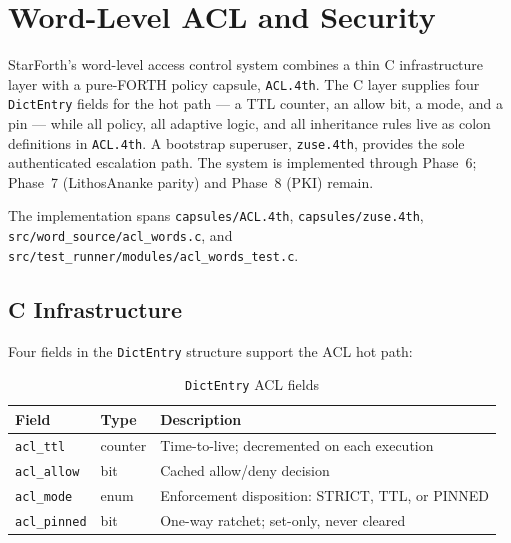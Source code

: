 
\chapter{Word-Level ACL and Security}
\label{vol2:chap:acl}

StarForth's word-level access control system combines a thin C infrastructure
layer with a pure-FORTH policy capsule, \texttt{ACL.4th}. The C layer supplies
four \texttt{DictEntry} fields for the hot path --- a TTL counter, an allow
bit, a mode, and a pin --- while all policy, all adaptive logic, and all
inheritance rules live as colon definitions in \texttt{ACL.4th}. A bootstrap
superuser, \texttt{zuse.4th}, provides the sole authenticated escalation path.
The system is implemented through Phase~6; Phase~7 (LithosAnanke parity) and
Phase~8 (PKI) remain.

The implementation spans \texttt{capsules/ACL.4th},
\texttt{capsules/zuse.4th}, \texttt{src/word\_source/acl\_words.c}, and
\texttt{src/test\_runner/modules/acl\_words\_test.c}.

\section{C Infrastructure}
\label{vol2:sec:acl:c}


Four fields in the \texttt{DictEntry} structure support the ACL hot path:

\begin{table}[ht]
  \centering
  \caption{\texttt{DictEntry} ACL fields}
  \label{tab:dictentry-acl}
  \begin{tabular}{lll}
    \toprule
    Field & Type & Description \\
    \midrule
    \texttt{acl\_ttl}    & counter  & Time-to-live; decremented on each execution \\
    \texttt{acl\_allow}  & bit      & Cached allow/deny decision \\
    \texttt{acl\_mode}   & enum     & Enforcement disposition: STRICT, TTL, or PINNED \\
    \texttt{acl\_pinned} & bit      & One-way ratchet; set-only, never cleared \\
    \bottomrule
  \end{tabular}
\end{table}


